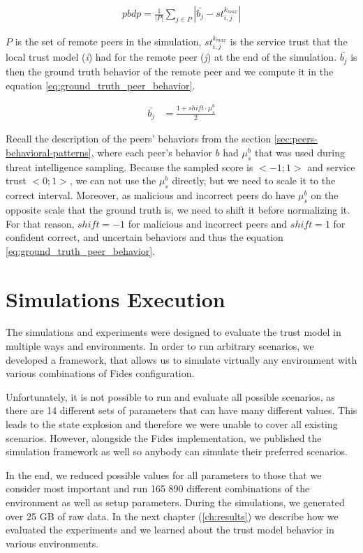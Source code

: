 \begin{equation}
\begin{split}
    pbdp = \frac{1}{|P|} \sum_{j \in P}\left|\bar{b_{j}} - st^{k_{max}}_{i, j} \right|
\end{split}
\label{eq:peers_behavior_detection_metric}
\end{equation}

$P$ is the set of remote peers in the simulation, $st^{k_{max}}_{i, j}$ is the service trust that the local trust model (\textit{i}) had for the remote peer (\textit{j}) at the end of the simulation.
$\bar{b_{j}}$ is then the ground truth behavior of the remote peer and we compute it in the equation \ref{eq:ground_truth_peer_behavior}.

\begin{equation}
    \begin{split}
    \bar{b_{j}} &= \frac{1 + shift \cdot \mu^{b}_{s}}{2}
    \end{split}
    \label{eq:ground_truth_peer_behavior}
\end{equation}

Recall the description of the peers' behaviors from the section \ref{sec:peers-behavioral-patterns}, where each peer's behavior $b$ had $\mu^{b}_{s}$ that was used during threat intelligence sampling.
Because the sampled score is $<-1; 1>$ and service trust $<0; 1>$, we can not use the $\mu^{b}_{s}$ directly, but we need to scale it to the correct interval.
Moreover, as malicious and incorrect peers  do have $\mu^{b}_{s}$ on the opposite scale that the ground truth is, we need to shift it before normalizing it.
For that reason, $shift = -1$ for malicious and incorrect peers and $shift = 1$ for confident correct, and uncertain behaviors and thus the equation \ref{eq:ground_truth_peer_behavior}.

\section{Simulations Execution}
\label{sec:simulations-execution}
The simulations and experiments were designed to evaluate the trust model in multiple ways and environments.
In order to run arbitrary scenarios, we developed a framework, that allows us to simulate virtually any environment with various combinations of Fides configuration.

Unfortunately, it is not possible to run and evaluate all possible scenarios, as there are 14 different sets of parameters that can have many different values.
This leads to the state explosion and therefore we were unable to cover all existing scenarios. 
However, alongside the Fides implementation, we published the simulation framework as well so anybody can simulate their preferred scenarios.

In the end, we reduced possible values for all parameters to those that we consider most important and run 165 890 different combinations of the environment as well as setup parameters.
During the simulations, we generated over 25 GB of raw data.
In the next chapter (\ref{ch:results}) we describe how we evaluated the experiments and we learned about the trust model behavior in various environments.